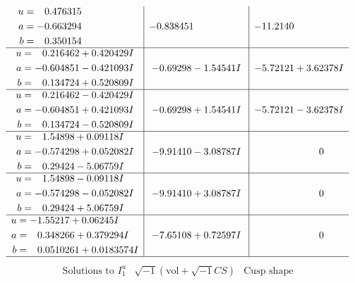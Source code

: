 \documentclass[1p]{elsarticle_modified}
\theoremstyle{definition}
\newcommand{\I}{\sqrt{-1}}
\begin{document}
$$\begin{array}{c|c|c}
\begin{aligned}
u &= \phantom{-}0.476315\phantom{ +0.000000I} \\
a &= -0.663294\phantom{ +0.000000I} \\
b &= \phantom{-}0.350154\phantom{ +0.000000I}\end{aligned}
 & -0.838451\phantom{ +0.000000I} & -11.2140\phantom{ +0.000000I} \\ \hline\begin{aligned}
u &= \phantom{-}0.216462 + 0.420429 I \\
a &= -0.604851 - 0.421093 I \\
b &= \phantom{-}0.134724 + 0.520809 I\end{aligned}
 & -0.69298 - 1.54541 I & -5.72121 + 3.62378 I \\ \hline\begin{aligned}
u &= \phantom{-}0.216462 - 0.420429 I \\
a &= -0.604851 + 0.421093 I \\
b &= \phantom{-}0.134724 - 0.520809 I\end{aligned}
 & -0.69298 + 1.54541 I & -5.72121 - 3.62378 I \\ \hline\begin{aligned}
u &= \phantom{-}1.54898 + 0.09118 I \\
a &= -0.574298 + 0.052082 I \\
b &= \phantom{-}0.29424 - 5.06759 I\end{aligned}
 & -9.91410 - 3.08787 I & \phantom{-0.000000 } 0 \\ \hline\begin{aligned}
u &= \phantom{-}1.54898 - 0.09118 I \\
a &= -0.574298 - 0.052082 I \\
b &= \phantom{-}0.29424 + 5.06759 I\end{aligned}
 & -9.91410 + 3.08787 I & \phantom{-0.000000 } 0 \\ \hline\begin{aligned}
u &= -1.55217 + 0.06245 I \\
a &= \phantom{-}0.348266 + 0.379294 I \\
b &= \phantom{-}0.0510261 + 0.0183574 I\end{aligned}
 & -7.65108 + 0.72597 I & \phantom{-0.000000 } 0\\
 \hline 
 \end{array}$$\newpage$$\begin{array}{c|c|c}  
\text{Solutions to }I^u_{1}& \I (\text{vol} + \sqrt{-1}CS) & \text{Cusp shape}\\

\end{array}$$
\end{document}
